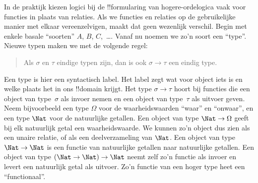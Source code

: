 \documentclass[openany]{memoir}
\begin{document}
In de praktijk kiezen logici bij de !!{formula}ring van hogere-ordelogica vaak
voor functies in plaats van relaties. Als we functies en relaties op de
gebruikelijke manier met elkaar vereenzelvigen, maakt dat geen wezenlijk
verschil. Begin met enkele basale ``soorten'' $A$, $B$, $C$,~\dots. Vanaf nu
noemen we zo'n soort een ``type''. Nieuwe typen maken we met de volgende regel:
\begin{quote}
Als $\sigma$ en $\tau$ eindige typen zijn, dan is ook $\sigma \to \tau$ een
eindig type.
\end{quote}
Een type is hier een syntactisch label. Het label zegt wat voor object iets is
en welke plaats het in ons !!{domain} krijgt. Het type $\sigma \to \tau$ hoort
bij functies die een object van type~$\sigma$ als invoer nemen en een object
van type~$\tau$ als uitvoer geven. Neem bijvoorbeeld een type $\Omega$ voor de
waarheidswaarden ``waar'' en ``onwaar'', en een type $\Nat$ voor de natuurlijke
getallen. Een object van type $\Nat \to \Omega$ geeft bij elk natuurlijk getal
een waarheidswaarde. We kunnen zo'n object dus zien als een unaire relatie, of
als een deelverzameling van $\Nat$. Een object van type $\Nat \to \Nat$ is een
functie van natuurlijke getallen naar natuurlijke getallen. Een object van
type $(\Nat \to \Nat) \to \Nat$ neemt zelf zo'n functie als invoer en levert
een natuurlijk getal als uitvoer. Zo'n functie van een hoger type heet een
``functionaal''.
\end{document}
